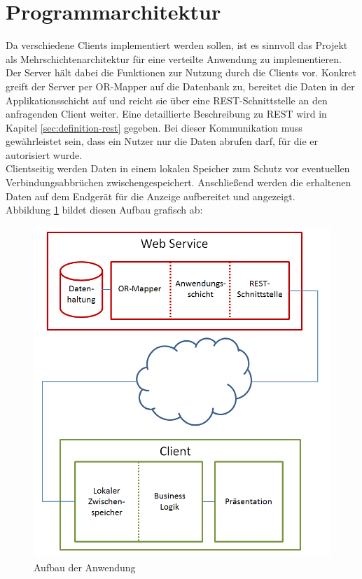 \section{Programmarchitektur}
\label{sec:programmarchitektur}
Da verschiedene Clients implementiert werden sollen, ist es sinnvoll das Projekt als Mehrschichtenarchitektur für eine verteilte Anwendung zu implementieren. \\
Der Server hält dabei die Funktionen zur Nutzung durch die Clients vor. Konkret greift der Server per \gls{OR-Mapper} auf die Datenbank zu, bereitet die Daten in der Applikationsschicht auf und reicht sie über eine \ac{REST}-Schnittstelle an den anfragenden Client weiter. Eine detaillierte Beschreibung zu \ac{REST} wird in Kapitel \ref{sec:definition-rest} gegeben. Bei dieser Kommunikation muss gewährleistet sein, dass ein Nutzer nur die Daten abrufen darf, für die er autorisiert wurde. \\
Clientseitig werden Daten in einem lokalen Speicher zum Schutz vor eventuellen Verbindungsabbrüchen zwischengespeichert. Anschließend werden die erhaltenen Daten auf dem Endgerät für die Anzeige aufbereitet und angezeigt. \\
Abbildung \ref{pic:architecture} bildet diesen Aufbau grafisch ab:
\begin{figure}[h]
\centering
\includegraphics[width=0.7\linewidth]{content/images/Aufbau-Architektur.png}
\caption{Aufbau der Anwendung}
\label{pic:architecture}
\end{figure}

\newpage
